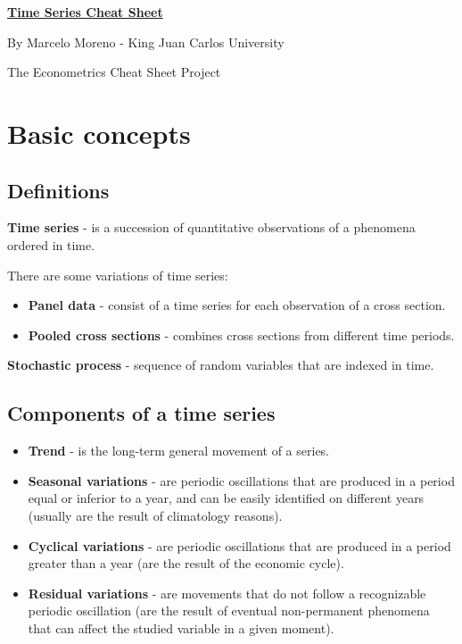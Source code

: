 \documentclass[10pt, a4paper, landscape]{extarticle}
\begin{document}
\setlength{\footskip}{12pt}

\begin{multicols}{3}

\begin{center}
	\textbf{\LARGE \href{https://github.com/marcelomijas/econometrics-cheatsheet}{Time Series Cheat Sheet}}

	{\footnotesize By Marcelo Moreno - King Juan Carlos University}

	{\footnotesize The Econometrics Cheat Sheet Project}
\end{center}

\section*{Basic concepts}

\subsection*{Definitions}

\textbf{Time series} - is a succession of quantitative observations of a phenomena ordered in time.

There are some variations of time series:

\begin{itemize}[leftmargin=*]
	\item \textbf{Panel data} - consist of a time series for each observation of a cross section.
	\item \textbf{Pooled cross sections} - combines cross sections from different time periods.
\end{itemize}

\textbf{Stochastic process} - sequence of random variables that are indexed in time.

\subsection*{Components of a time series}

\begin{itemize}[leftmargin=*]
	\item \textbf{Trend} - is the long-term general movement of a series.
	\item \textbf{Seasonal variations} - are periodic oscillations that are produced in a period equal or inferior to a year, and can be easily identified on different years (usually are the result of climatology reasons).
	\item \textbf{Cyclical variations} - are periodic oscillations that are produced in a period greater than a year (are the result of the economic cycle).
	\item \textbf{Residual variations} - are movements that do not follow a recognizable periodic oscillation (are the result of eventual non-permanent phenomena that can affect the studied variable in a given moment).
\end{itemize}


\end{multicols}
\end{document}
